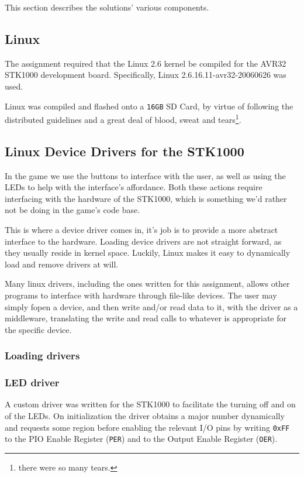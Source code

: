 This section describes the solutions' various components.

\subsection{Linux}
	The assignment required that the Linux 2.6 kernel be compiled for the AVR32 STK1000 development board.
	Specifically, Linux 2.6.16.11-avr32-20060626 was used.

	Linux was compiled and flashed onto a \texttt{16GB} SD Card, by virtue of following the distributed guidelines and a great deal of blood, sweat and tears\footnote{there were so many tears.}.

\subsection{Linux Device Drivers for the STK1000}
In the game we use the buttons to interface with the user, as well as using the LEDs to help with the interface's affordance.
Both these actions require interfacing with the hardware of the STK1000, which is something we'd rather not be doing in the game's code base.

This is where a device driver comes in, it's job is to provide a more abstract interface to the hardware.
Loading device drivers are not straight forward, as they usually reside in kernel space.
Luckily, Linux makes it easy to dynamically load and remove drivers at will.

Many linux drivers, including the ones written for this assignment, allows other programs to interface with hardware through file-like devices.
The user may simply fopen a device, and then write and/or read data to it, with the driver as a middleware, translating the write and read calls to whatever is appropriate for the specific device.
	\subsubsection{Loading drivers}


	\subsubsection{LED driver}
		A custom driver was written for the STK1000 to facilitate the turning off and on of the LEDs.
		On initialization the driver obtains a major number dynamically and requests some region before enabling the relevant I/O pins by writing \texttt{0xFF} to the PIO Enable Register (\texttt{PER}) and to the Output Enable Register (\texttt{OER}).
		
